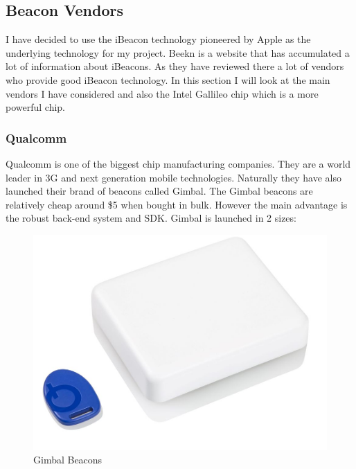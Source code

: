 


\subsection{Beacon Vendors}

I have decided to use the iBeacon technology pioneered by Apple as
the underlying technology for my project. Beekn\cite{beekn} is a
website that has accumulated a lot of information about iBeacons.
As they have reviewed there a lot of vendors who provide good iBeacon
technology. In this section I will look at the main vendors I have
considered and also the Intel Gallileo chip which is a more powerful
chip.


\subsubsection{Qualcomm}

Qualcomm\cite{quallcomm} is one of the biggest chip manufacturing
companies. They are a world leader in 3G and next generation mobile
technologies. Naturally they have also launched their brand of beacons
called Gimbal\cite{gimbal}. The Gimbal beacons are relatively cheap
around \$5 when bought in bulk. However the main advantage is the
robust back-end system and SDK. Gimbal is launched in 2 sizes:

\begin{figure}[H]
\includegraphics[scale=0.3]{images/gimbal-beacon}

\protect\caption{Gimbal Beacons}
\end{figure}

